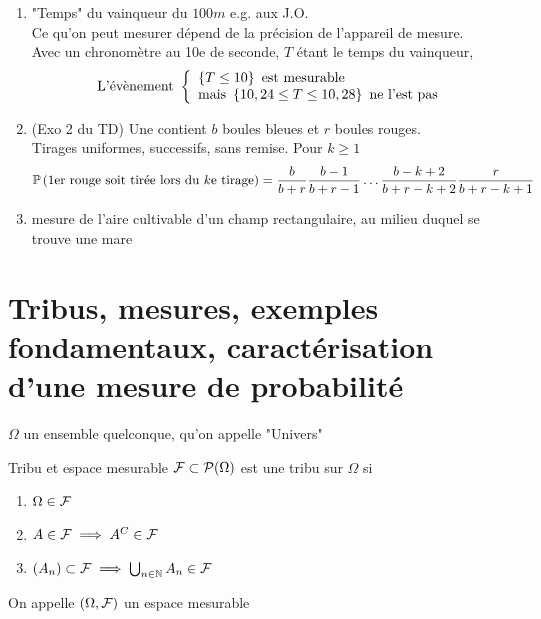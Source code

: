 \documentclass[]{report}
\begin{document}
\begin{ex}{}{}
    \begin{enumerate}
        \item "Temps" du vainqueur du $100m$ e.g. aux J.O.\\
              Ce qu'on peut mesurer dépend de la précision de l'appareil de mesure.\\
              Avec un chronomètre au 10e de seconde, $T$ étant le temps du vainqueur,
              \[\text{L'évènement } \left\{\begin{array}{ll} \left\{ T\le 10\right\}\text{ est mesurable}\\ \text{mais }\left\{10,24\le T\le 10,28\right\}\text{ ne l'est pas}  \end{array} \right.\]
        \item (Exo 2 du TD) Une contient $b$ boules bleues et $r$ boules rouges.\\
              Tirages uniformes, successifs, sans remise. Pour $k\ge 1$
              \[\mathbb{P}\left(\text{1er rouge soit tirée lors du $k$e tirage}\right)=\dfrac{b}{b+r}\dfrac{b-1}{b+r-1}\ldots \dfrac{b-k+2}{b+r-k+2}\dfrac{r}{b+r-k+1}\]
        \item mesure de l'aire cultivable d'un champ rectangulaire, au milieu duquel se trouve une mare
    \end{enumerate}
\end{ex}

\section{Tribus, mesures, exemples fondamentaux, caractérisation d'une mesure de probabilité}

$\Omega$ un ensemble quelconque, qu'on appelle "Univers"

\begin{df}{Tribu et espace mesurable}{}
    $\mathcal{F}\subset \mathcal{P}(\Omega)$ est une tribu sur $\Omega$ si
    \begin{enumerate}[label=\roman*]
        \item $\Omega\in \mathcal{F}$
        \item $A\in \mathcal{F}\implies A^C\in \mathcal{F}$
        \item $(A_n)\subset \mathcal{F}\implies \bigcup_{{n\in\mathbb{N}}} A_n\in \mathcal{F}$
    \end{enumerate}
    On appelle $(\Omega,\mathcal{F})$ un espace mesurable
\end{df}
\end{document}
